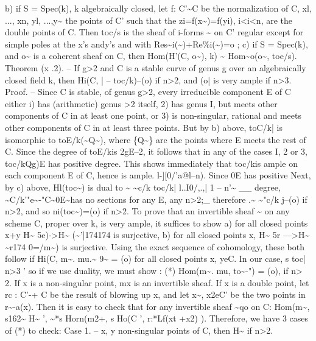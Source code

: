 \documentclass[11pt]{article}
\theoremstyle{plain}
\theoremstyle{definition}
\theoremstyle{remark}
\begin{document}
b) if S = Spec(k), k algebraically closed, let f: C'\textasciitilde{}C be the normalization of C, xl, ..., xn, yl, ...,y\textasciitilde{} the points of C' such that the zi=f(x\textasciitilde{})=f(yi), i<i<n, are the double points of C. Then toc/s is the sheaf of i-forms \textasciitilde{} on C' regular except for simple poles at the x's andy's and with Res\textasciitilde{}i(\textasciitilde{})+Re\%i(\textasciitilde{})=o ; c) if S = Spec(k), and o\textasciitilde{} is a coherent sheaf on C, then Hom(H'(C, o\textasciitilde{}), k) \textasciitilde{} Hom\textasciitilde{}o(o\textasciitilde{}, toe/s). Theorem (x .2). -- If g>2 and C is a stable curve of genus g over an algebraically closed field k, then Hi(C, | -- toc/k)--(o) if n>2, and (o| is very ample if n>3. Proof. -- Since C is stable, of genus g>2, every irreducible component E of C either i) has (arithmetic) genus >2 itself, 2) has genus I, but meets other components of C in at least one point, or 3) is non-singular, rational and meets other components of C in at least three points. But by b) above, toC/k| is isomorphic to toE/k(\textasciitilde{}Q\textasciitilde{}), where \{Q\textasciitilde{}\} are the points where E meets the rest of C. Since the degree of toE/kis 2gE--2, it follows that in any of the cases I, 2 or 3, toc/kQg)E has positive degree. This shows immediately that toc/kis ample on each component E of C, hence is ample. l-][0/'a@l--n). Since 0E has positive Next, by c) above, Hl(toc\textasciitilde{}) is dual to \textasciitilde{} \textasciitilde{}c/k toc/k| l..I0/,.,| 1 -- n'\textasciitilde{} \_\_ degree, \textasciitilde{}C/k'"e\textasciitilde{}-"C\textasciitilde{}0E\textasciitilde{}has no sections for any E, any n>2;\_ therefore .\textasciitilde{} \textasciitilde{}"c/k j--(o) if n>2, and so ni(toc\textasciitilde{})=(o) if n>2. To prove that an invertible sheaf \textasciitilde{} on any scheme C, proper over k, is very ample, it suffices to show a) for all closed points x+y H\textasciitilde{} 5e)->H\textasciitilde{} (\textasciitilde{}'|174174 is surjective, b) for all closed points x, H\textasciitilde{} 5r --->H\textasciitilde{} \textasciitilde{}r174 0=/m\textasciitilde{}) is surjective. Using the exact sequence of cohomology, these both follow if Hi(C, m\textasciitilde{}. mu.\textasciitilde{} 9\textasciitilde{} = (o) for all closed points x, yeC. In our case, s toc| n>3 ' so if we use duality, we must show : (*) Hom(m\textasciitilde{}. mu, to\textasciitilde{}-") = (o), if n> 2. If x is a non-singular point, mx is an invertible sheaf. If x is a double point, let rc : C'-+ C be the result of blowing up x, and let x\textasciitilde{}, x2eC' be the two points in r\textasciitilde{}-a(x). Then it is easy to check that for any invertible sheaf \textasciitilde{}qo on C: Hom(m\textasciitilde{}, s162\textasciitilde{} H\textasciitilde{} ', \textasciitilde{}*s Horn(m2+, s Ho(C ', r:*Lf(xt +x2) ). Therefore, we have 3 cases of (*) to check: Case 1. -- x, y non-singular points of C, then H\textasciitilde{} if n>2.
\end{document}
